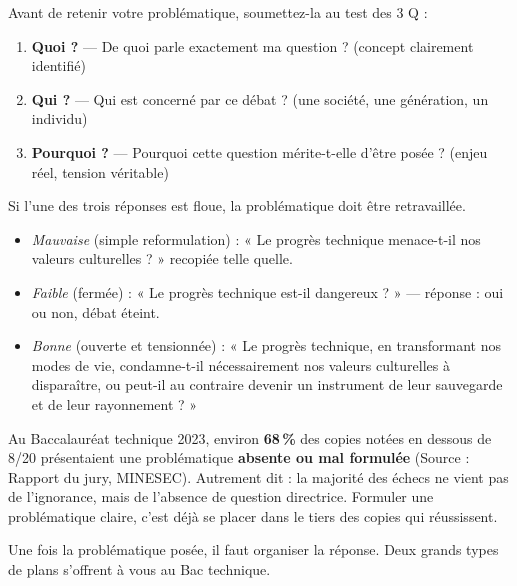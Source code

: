 \documentclass[11pt]{article}
\newcounter{popsec}
\newcounter{popsub}
\newcommand{\courssub}[1]{%
  \stepcounter{popsub}%
  \par\vspace{9pt}\noindent{\popxbold\fontsize{11.5}{13}\selectfont\color{popink}{\color{poporange}\thepopsec.\thepopsub}\hspace{6pt}#1}\par\nopagebreak\vspace{4pt}
}
\begin{document}
\begin{methode}
Avant de retenir votre problématique, soumettez-la au test des 3 Q :
\begin{enumerate}
\item \textbf{Quoi ?} — De quoi parle exactement ma question ? (concept clairement identifié)
\item \textbf{Qui ?} — Qui est concerné par ce débat ? (une société, une génération, un individu)
\item \textbf{Pourquoi ?} — Pourquoi cette question mérite-t-elle d'être posée ? (enjeu réel, tension véritable)
\end{enumerate}
Si l'une des trois réponses est floue, la problématique doit être retravaillée.
\end{methode}

\begin{exemplebox}
\begin{itemize}
\item \emph{Mauvaise} (simple reformulation) : « Le progrès technique menace-t-il nos valeurs culturelles ? » recopiée telle quelle.
\item \emph{Faible} (fermée) : « Le progrès technique est-il dangereux ? » — réponse : oui ou non, débat éteint.
\item \emph{Bonne} (ouverte et tensionnée) : « Le progrès technique, en transformant nos modes de vie, condamne-t-il nécessairement nos valeurs culturelles à disparaître, ou peut-il au contraire devenir un instrument de leur sauvegarde et de leur rayonnement ? »
\end{itemize}
\end{exemplebox}

\begin{exemplebox}
Au Baccalauréat technique 2023, environ \textbf{68\,\%} des copies notées en dessous de 8/20 présentaient une problématique \textbf{absente ou mal formulée} (Source : Rapport du jury, MINESEC). Autrement dit : la majorité des échecs ne vient pas de l'ignorance, mais de l'absence de question directrice. Formuler une problématique claire, c'est déjà se placer dans le tiers des copies qui réussissent.
\end{exemplebox}

\courssub{Étape 4 : Construire le plan}

Une fois la problématique posée, il faut organiser la réponse. Deux grands types de plans s'offrent à vous au Bac technique.
\end{document}

